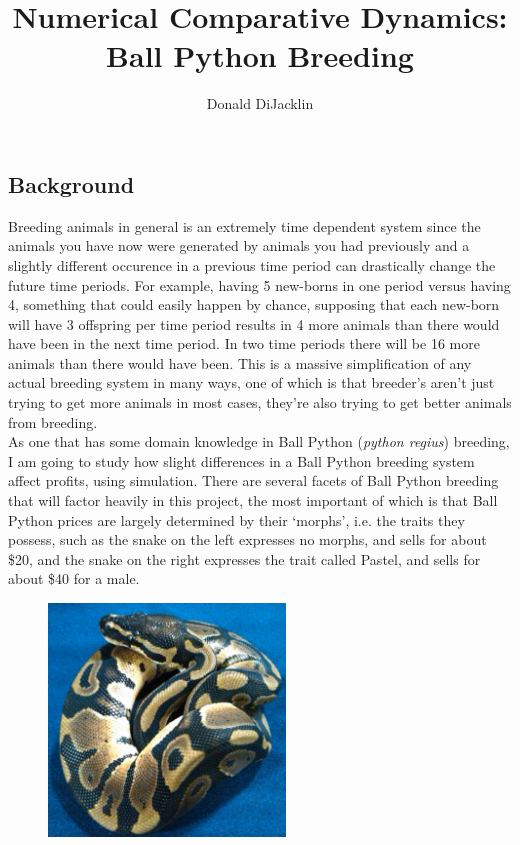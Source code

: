 \documentclass{paper}
\begin{document}
\newcommand*{\be}{\mathbb{E}}
\newcommand*{\bv}{\mathbb{V}}
\lstset{showspaces = false, showstringspaces = false}
\linespread{2}
\title{Numerical Comparative Dynamics: Ball Python Breeding}
\author{Donald DiJacklin}
\maketitle

\begin{spacing}{1.5}
\section*{Background}
	\indent\indent Breeding animals in general is an extremely time dependent system since the animals you have now were generated by animals you had previously and a slightly different occurence in a previous time period can drastically change the future time periods. For example, having 5 new-borns in one period versus having 4, something that could easily happen by chance, supposing that each new-born will have 3 offspring per time period results in 4 more animals than there would have been in the next time period. In two time periods there will be 16 more animals than there would have been. This is a massive simplification of any actual breeding system in many ways, one of which is that breeder's aren't just trying to get more animals in most cases, they're also trying to get better animals from breeding.\\
	As one that has some domain knowledge in Ball Python (\textit{python regius}) breeding, I am going to study how slight differences in a Ball Python breeding system affect profits, using simulation. There are several facets of Ball Python breeding that will factor heavily in this project, the most important of which is that Ball Python prices are largely determined by their `morphs', i.e. the traits they possess, such as the snake on the left expresses no morphs, and sells for about \$20, and the snake on the right expresses the trait called Pastel, and sells for about \$40 for a male.\\
	\begin{multicols}{2}
	\begin{figure}[H]
	\centering
	\includegraphics[width=.5\textwidth, height = 62mm]{Normal.jpg}

\end{figure}
\end{multicols}
\end{spacing}
\end{document}
